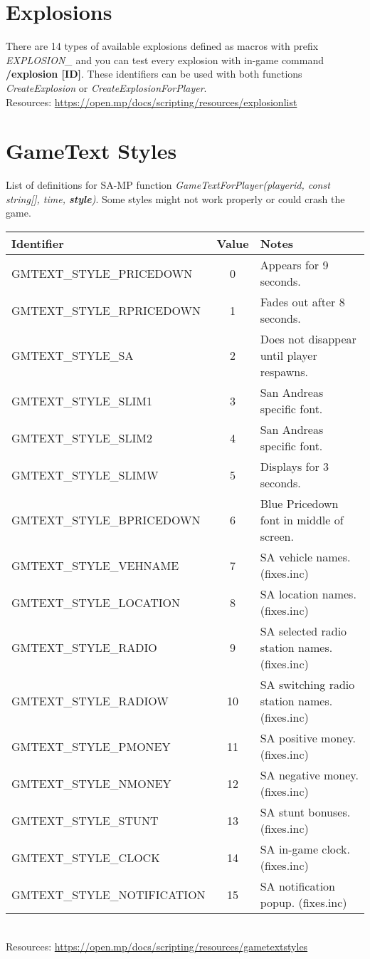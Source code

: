 \documentclass{article}
\begin{document}
\section{Explosions}
There are 14 types of available explosions defined as macros with prefix \textit{EXPLOSION\_} and you can test every explosion with in-game command \textbf{/explosion [ID]}. These identifiers can be used with both functions \textit{CreateExplosion} or \textit{CreateExplosionForPlayer}.
\bigskip
\\Resources: \url{https://open.mp/docs/scripting/resources/explosionlist}


\newpage
\section{GameText Styles}
\begin{sloppypar}
List of definitions for SA-MP function \textit{GameTextForPlayer(playerid, const string[], time, \textbf{style})}. Some styles might not work properly or could crash the game.
\end{sloppypar}
\bigskip
\noindent\begin{tabular}{ |l|c|l| } 
\hline
Identifier & Value & Notes \\
\hline
GMTEXT\_STYLE\_PRICEDOWN & 0 & Appears for 9 seconds. \\
GMTEXT\_STYLE\_RPRICEDOWN & 1 & Fades out after 8 seconds.\\
GMTEXT\_STYLE\_SA & 2 & Does not disappear until player respawns. \\
GMTEXT\_STYLE\_SLIM1 & 3 & San Andreas specific font. \\
GMTEXT\_STYLE\_SLIM2 & 4 & San Andreas specific font. \\
GMTEXT\_STYLE\_SLIMW & 5 & Displays for 3 seconds. \\
GMTEXT\_STYLE\_BPRICEDOWN & 6 & Blue Pricedown font in middle of screen. \\
GMTEXT\_STYLE\_VEHNAME & 7 & SA vehicle names. (fixes.inc) \\
GMTEXT\_STYLE\_LOCATION & 8 & SA location names. (fixes.inc) \\
GMTEXT\_STYLE\_RADIO & 9 & SA selected radio station names. (fixes.inc) \\
GMTEXT\_STYLE\_RADIOW & 10 & SA switching radio station names. (fixes.inc) \\
GMTEXT\_STYLE\_PMONEY & 11 & SA positive money. (fixes.inc) \\
GMTEXT\_STYLE\_NMONEY & 12 & SA negative money. (fixes.inc) \\
GMTEXT\_STYLE\_STUNT & 13 & SA stunt bonuses. (fixes.inc) \\
GMTEXT\_STYLE\_CLOCK & 14 & SA in-game clock. (fixes.inc) \\
GMTEXT\_STYLE\_NOTIFICATION & 15 & SA notification popup. (fixes.inc) \\
\hline
\end{tabular}
\bigskip
\\Resources: \url{https://open.mp/docs/scripting/resources/gametextstyles}
\end{document}
